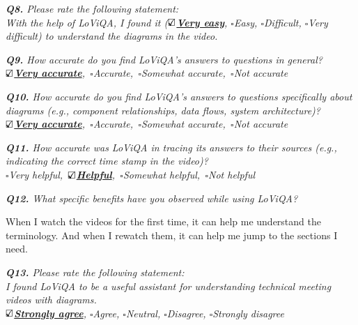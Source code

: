 \vspace*{1em}\noindent\textit{\textbf{Q8.} Please rate the following statement:
\\[.5em]
 \textit{With the help of LoViQA, I found it}
(\underline{\bfseries$\text{\rlap{$\checkmark$}}\square$Very easy}, $\square$Easy, $\square$Difficult, $\square$Very difficult)
to understand the diagrams in the video.
}


\vspace*{1em}\noindent\textit{\textbf{Q9.} How accurate do you find LoViQA's answers to questions in general?
\\[.5em]
        \indent\underline{\bfseries$\text{\rlap{$\checkmark$}}\square$Very accurate},\,
        $\square$Accurate,\,
        $\square$Somewhat accurate,\,
        $\square$Not accurate
}



\vspace*{1em}\noindent\textit{\textbf{Q10.} How accurate do you find LoViQA's answers to questions specifically about diagrams (e.g., component relationships, data flows, system architecture)?
\\[.5em]
        \indent \underline{\bfseries$\text{\rlap{$\checkmark$}}\square$Very accurate},\,
        $\square$Accurate,\,
        $\square$Somewhat accurate,\,
        $\square$Not accurate
}



\vspace*{1em}\noindent\textit{\textbf{Q11.} 
How accurate was LoViQA in tracing its answers to their sources
(e.g.,  indicating the correct time stamp in the video)?
\\[.5em]
\indent $\square$Very helpful,\,
\underline{\bfseries$\text{\rlap{$\checkmark$}}\square$Helpful},\,
$\square$Somewhat helpful,\,
$\square$Not helpful
}


\vspace*{1em}\noindent\textit{\textbf{Q12.} What specific benefits have you observed while using LoViQA?
}
\begin{samepage}
\begin{mdframed}[style=MyFrame]
When I watch the videos for the first time, it can help me understand the terminology. And when I rewatch them, it can help me jump to the sections I need.
\end{mdframed}
\end{samepage}

\vspace*{1em}\noindent\textit{\textbf{Q13.} Please rate the following statement:
\\[.5em]
\textit{I found LoViQA to be a useful assistant for understanding technical meeting videos with diagrams.}
\\[.5em]
\indent \underline{\bfseries$\text{\rlap{$\checkmark$}}\square$Strongly agree},
$\square$Agree,
$\square$Neutral,
$\square$Disagree,
$\square$Strongly disagree
}


